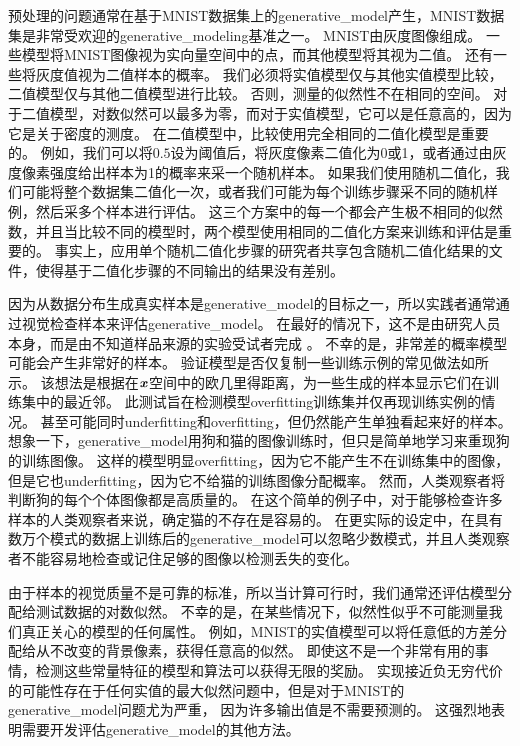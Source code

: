 
预处理的问题通常在基于MNIST数据集上的\gls{generative_model}产生，MNIST数据集是非常受欢迎的\gls{generative_modeling}基准之一。
MNIST由灰度图像组成。
一些模型将MNIST图像视为实向量空间中的点，而其他模型将其视为二值。
还有一些将灰度值视为二值样本的概率。
我们必须将实值模型仅与其他实值模型比较，二值模型仅与其他二值模型进行比较。
否则，测量的似然性不在相同的空间。
对于二值模型，对数似然可以最多为零，而对于实值模型，它可以是任意高的，因为它是关于密度的测度。
在二值模型中，比较使用完全相同的二值化模型是重要的。
例如，我们可以将$0.5$设为阈值后，将灰度像素二值化为0或1，或者通过由灰度像素强度给出样本为1的概率来采一个随机样本。
如果我们使用随机二值化，我们可能将整个数据集二值化一次，或者我们可能为每个训练步骤采不同的随机样例，然后采多个样本进行评估。
这三个方案中的每一个都会产生极不相同的似然数，并且当比较不同的模型时，两个模型使用相同的二值化方案来训练和评估是重要的。
事实上，应用单个随机二值化步骤的研究者共享包含随机二值化结果的文件，使得基于二值化步骤的不同输出的结果没有差别。

因为从数据分布生成真实样本是\gls{generative_model}的目标之一，所以实践者通常通过视觉检查样本来评估\gls{generative_model}。
在最好的情况下，这不是由研究人员本身，而是由不知道样品来源的实验受试者完成 \citep{denton2015deep}。
不幸的是，非常差的概率模型可能会产生非常好的样本。
验证模型是否仅复制一些训练示例的常见做法如所示。
该想法是根据在$\boldsymbol{\mathit{x}}$空间中的欧几里得距离，为一些生成的样本显示它们在训练集中的最近邻。
此测试旨在检测模型\gls{overfitting}训练集并仅再现训练实例的情况。
甚至可能同时\gls{underfitting}和\gls{overfitting}，但仍然能产生单独看起来好的样本。
想象一下，\gls{generative_model}用狗和猫的图像训练时，但只是简单地学习来重现狗的训练图像。
这样的模型明显\gls{overfitting}，因为它不能产生不在训练集中的图像，但是它也\gls{underfitting}，因为它不给猫的训练图像分配概率。
然而，人类观察者将判断狗的每个个体图像都是高质量的。
在这个简单的例子中，对于能够检查许多样本的人类观察者来说，确定猫的不存在是容易的。
在更实际的设定中，在具有数万个模式的数据上训练后的\gls{generative_model}可以忽略少数模式，并且人类观察者不能容易地检查或记住足够的图像以检测丢失的变化。


由于样本的视觉质量不是可靠的标准，所以当计算可行时，我们通常还评估模型分配给测试数据的对数似然。
不幸的是，在某些情况下，似然性似乎不可能测量我们真正关心的模型的任何属性。
例如，MNIST的实值模型可以将任意低的方差分配给从不改变的背景像素，获得任意高的似然。
即使这不是一个非常有用的事情，检测这些常量特征的模型和算法可以获得无限的奖励。
实现接近负无穷代价的可能性存在于任何实值的最大似然问题中，但是对于MNIST的\gls{generative_model}问题尤为严重， 因为许多输出值是不需要预测的。
这强烈地表明需要开发评估\gls{generative_model}的其他方法。


